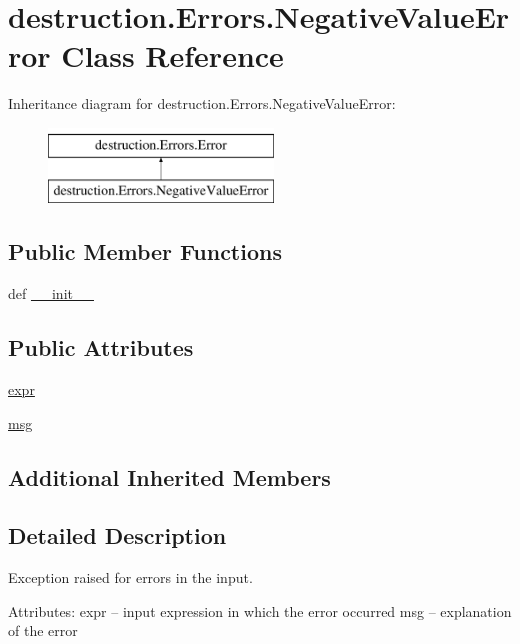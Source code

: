 \hypertarget{classdestruction_1_1_errors_1_1_negative_value_error}{\section{destruction.\-Errors.\-Negative\-Value\-Error Class Reference}
\label{classdestruction_1_1_errors_1_1_negative_value_error}
}
Inheritance diagram for destruction.\-Errors.\-Negative\-Value\-Error\-:\begin{figure}[H]
\begin{center}
\leavevmode
\includegraphics[height=2.000000cm]{classdestruction_1_1_errors_1_1_negative_value_error}
\end{center}
\end{figure}
\subsection*{Public Member Functions}
\begin{DoxyCompactItemize}
\item 
def \hyperlink{classdestruction_1_1_errors_1_1_negative_value_error_ab24de88ef9dd043db6e927254d274e58}{\-\_\-\-\_\-init\-\_\-\-\_\-}
\end{DoxyCompactItemize}
\subsection*{Public Attributes}
\begin{DoxyCompactItemize}
\item 
\hyperlink{classdestruction_1_1_errors_1_1_negative_value_error_aed3e34f418f129b9a7b39b1b58a38c2d}{expr}
\item 
\hyperlink{classdestruction_1_1_errors_1_1_negative_value_error_accd4eab44fe6859be48d881adb7cf823}{msg}
\end{DoxyCompactItemize}
\subsection*{Additional Inherited Members}


\subsection{Detailed Description}
\begin{DoxyVerb}Exception raised for errors in the input.

Attributes:
    expr -- input expression in which the error occurred
    msg  -- explanation of the error
\end{DoxyVerb}
 

